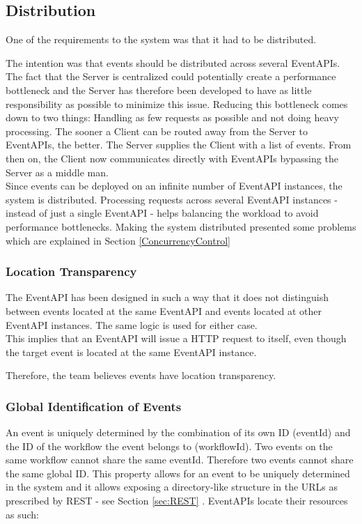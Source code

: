 \subsection{Distribution}
One of the requirements to the system was that it had to be distributed.
 
The intention was that events should be distributed across several EventAPIs. The fact that the Server is centralized could potentially create a performance bottleneck and the Server has therefore been developed to have as little responsibility as possible to minimize this issue. Reducing this bottleneck comes down to two things: Handling as few requests as possible and not doing heavy processing. The sooner a Client can be routed away from the Server to EventAPIs, the better. The Server supplies the Client with a list of events. From then on, the Client now communicates directly with EventAPIs bypassing the Server as a middle man.\\

Since events can be deployed on an infinite number of EventAPI instances, the system is distributed. Processing requests across several EventAPI instances - instead of just a single EventAPI - helps balancing the workload to avoid performance bottlenecks. 
Making the system distributed presented some problems which are explained in Section \ref{ConcurrencyControl} 

\subsubsection{Location Transparency}
The EventAPI has been designed in such a way that it does not distinguish between events located at the same EventAPI and events located at other EventAPI instances. The same logic is used for either case. \\

This implies that an EventAPI will issue a HTTP request to itself, even though the target event is located at the same EventAPI instance. 

Therefore, the team believes events have location transparency.

\subsubsection{\label{sec:GlobalID}Global Identification of Events}
An event is uniquely determined by the combination of its own ID (eventId) and the ID of the workflow the event belongs to (workflowId). Two events on the same workflow cannot share the same eventId. Therefore two events cannot share the same global ID. 
This property allows for an event to be uniquely determined in the system and it allows exposing a directory-like structure in the URLs as prescribed by REST - see Section \ref{sec:REST} . 
EventAPIs locate their resources as such: \\

